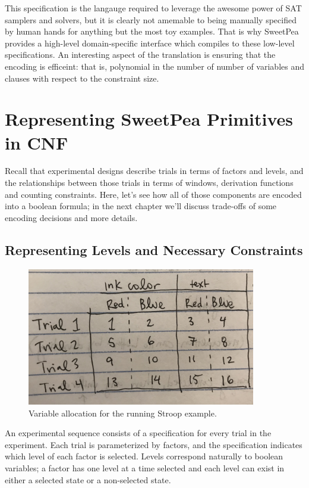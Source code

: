 This specification is the langauge required to leverage the awesome power of SAT samplers and solvers, but it is clearly not amemable to being manually specified by human hands for anything but the most toy examples. That is why SweetPea provides a high-level domain-specific interface which compiles to these low-level specifications. An interesting aspect of the translation is ensuring that the encoding is efficeint: that is, polynomial in the number of number of variables and clauses with respect to the constraint size.

\section{Representing SweetPea Primitives in CNF}

Recall that experimental designs describe trials in terms of factors and levels, and the relationships between those trials in terms of windows, derivation functions and counting constraints. Here, let's see how all of those components are encoded into a boolean formula; in the next chapter we'll discuss trade-offs of some encoding decisions and more details.

\subsection{Representing Levels and Necessary Constraints}

\begin{figure}[t]
    \centerline{\includegraphics[origin=c,width=10cm]{encoding_strupe_vars}}
    \caption{Variable allocation for the running Stroop example.}%
    \label{fig:encoding_strupe_vars}%
\end{figure}

An experimental sequence consists of a specification for every trial in the experiment. Each trial is parameterized by factors, and the specification indicates which level of each factor is selected. Levels correspond naturally to boolean variables; a factor has one level at a time selected and each level can exist in either a selected state or a non-selected state.

